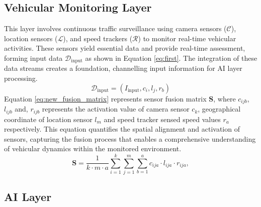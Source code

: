 \documentclass[10pt, conference, a4paper, compsocconf]{IEEEtran}
\begin{document}
\subsection{Vehicular Monitoring Layer}
This layer involves continuous traffic surveillance using camera sensors ($\mathcal{C}$), location sensors ($\mathcal{L}$), and speed trackers ($\mathcal{R}$) to monitor real-time vehicular activities. These sensors yield essential data and provide real-time assessment, forming input data $\mathcal{D}_{\text{input}}$ as shown in Equation \ref{eq:first}. The integration of these data streams creates a foundation, channelling input information for AI layer processing.
\begin{equation}\label{eq:first}
\mathcal{D}_{\text{input}} = (I_{\text{input}}, c_{i}, l_{j}, r_{b})
\end{equation}
\indent Equation \ref{eq:new_fusion_matrix} represents sensor fusion matrix $\mathbf{S}$, where $c_{ijb}$, $l_{ijb}$ and, $r_{ijb}$ represents the activation value of camera sensor $c_{k}$, geographical coordinate of location sensor $l_{m}$ and speed tracker sensed speed values $r_{a}$ respectively. This equation quantifies the spatial alignment and activation of sensors, capturing the fusion process that enables a comprehensive understanding of vehicular dynamics within the monitored environment.
\begin{equation}\label{eq:new_fusion_matrix}
\mathbf{S} = \frac{1}{{k \cdot m \cdot a}} \sum_{i=1}^{k} \sum_{j=1}^{m} \sum_{b=1}^{a} c_{ija} \cdot l_{ija} \cdot r_{ija},
\end{equation}
\subsection{AI Layer}

\end{document}

